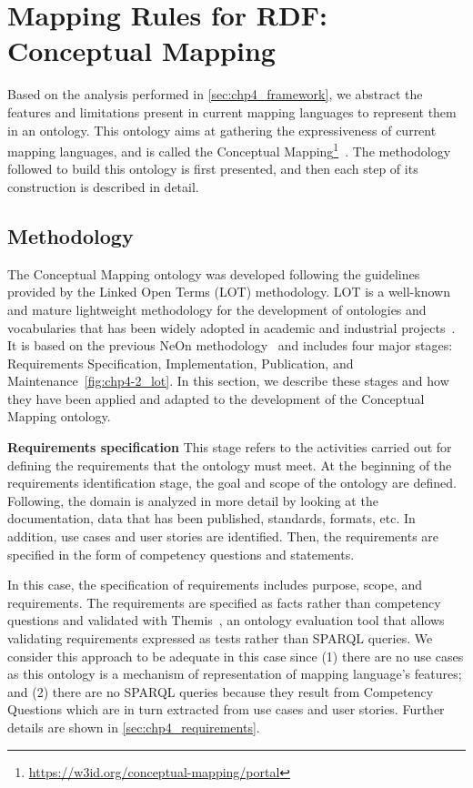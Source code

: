 \section{Mapping Rules for RDF: Conceptual Mapping}
\label{sec:chp4_cm_ontology}

Based on the analysis performed in \cref{sec:chp4_framework}, we abstract the features and limitations present in current mapping languages to represent them in an ontology. This ontology aims at gathering the expressiveness of current mapping languages, and is called the Conceptual Mapping\footnote{\label{foot:cmportal}\url{https://w3id.org/conceptual-mapping/portal}}~\parencite{iglesias2022cm}. The methodology followed to build this ontology is first presented, and then each step of its construction is described in detail.

\subsection{Methodology}
The Conceptual Mapping ontology was developed following the guidelines provided by the Linked Open Terms (LOT) methodology. LOT is a well-known and mature lightweight methodology for the development of ontologies and vocabularies that has been widely adopted in academic and industrial projects~\parencite{poveda2022lot}. It is based on the previous NeOn methodology~\parencite{suarez2015neon} and includes four major stages: Requirements Specification, Implementation, Publication, and Maintenance~\cref{fig:chp4-2_lot}. In this section, we describe these stages and how they have been applied and adapted to the development of the Conceptual Mapping ontology.

\noindent\textbf{Requirements specification}
This stage refers to the activities carried out for defining the requirements that the ontology must meet. At the beginning of the requirements identification stage, the goal and scope of the ontology are defined. Following, the domain is analyzed in more detail by looking at the documentation, data that has been published, standards, formats, etc. In addition, use cases and user stories are identified. Then, the requirements are specified in the form of competency questions and statements. 

In this case, the specification of requirements includes purpose, scope, and requirements. The requirements are specified as facts rather than competency questions and validated with Themis~\parencite{fernandez2021themis}, an ontology evaluation tool that allows validating requirements expressed as tests rather than SPARQL queries. We consider this approach to be adequate in this case since (1) there are no use cases as this ontology is a mechanism of representation of  mapping language's features; and (2) there are no SPARQL queries because they result from Competency Questions which are in turn extracted from use cases and user stories. Further details are shown in \cref{sec:chp4_requirements}.

